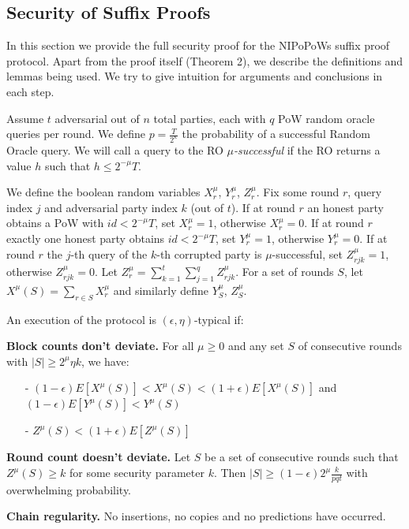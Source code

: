 \subsection{Security of Suffix Proofs} \label{proof_under_hard_fork}
In this section we provide the full security proof for the NIPoPoWs suffix proof
protocol\cite{nipopows}. Apart from the proof itself (Theorem 2), we describe the
definitions and lemmas being used. We try to give intuition for arguments and
conclusions in each step.

Assume $t$ adversarial out of $n$ total parties, each with $q$ PoW random oracle
queries per round. We define $p = \frac{T}{2^\kappa}$ the probability of a
successful Random Oracle query. We will call a query to the RO $\mu$\textit{-successful}
if the RO returns a value $h$ such that $h \leq 2^{-\mu}T$.

We define the boolean random variables $X_r^{\mu}$, $Y_r^{\mu}$, $Z_r^{\mu}$.
Fix some round $r$, query index $j$ and adversarial party index $k$ (out of $t$).
If at round $r$ an honest party obtains a PoW with $id < 2^{-\mu}T$, set $X_r^{\mu} = 1$,
otherwise $X_r^{\mu} = 0$. If at round $r$ exactly one honest party obtains
$id < 2^{-\mu}T$, set $Y_r^{\mu} = 1$, otherwise $Y_r^{\mu} = 0$. If at round $
r$ the $j$-th query of the $k$-th corrupted party is $\mu$-successful, set
$Z_{rjk}^{\mu} = 1$, otherwise $Z_{rjk}^{\mu} = 0$. Let $Z_r^{\mu} =
\sum_{k=1}^t\sum_{j=1}^qZ_{rjk}^{\mu}$. For a set of rounds $S$, let
$X^\mu(S) = \sum_{r \in S}X^{\mu}_r$ and similarly define $Y_S^{\mu}$, $Z_S^{\mu}$.\\

\begin{defn}
	An execution of the protocol is $(\epsilon, \eta)$-typical if:
	
	\textbf{Block counts don't deviate.} For all $\mu \geq 0$ and any set
	$S$ of consecutive rounds with $\vert S \vert \geq 2^\mu \eta k$, we have:
	\begin{itemize}
		\item[-] $(1-\epsilon)E[X^\mu(S)] < X^\mu(S) < (1+\epsilon)E[X^\mu(S)] $ and
			$(1-\epsilon)E[Y^\mu(S)] < Y^\mu(S)$
		\item[-] $Z^\mu(S) < (1+\epsilon)E[Z^\mu(S)]$
\end{itemize}

	\textbf{Round count doesn't deviate.} Let $S$ be a set of consecutive rounds
	such that $Z^\mu(S) \geq k$ for some security parameter $k$. Then $\vert S \vert
	\geq (1-\epsilon)2^\mu \frac{k}{pqt}$ with overwhelming probability.
	
	\textbf{Chain regularity.} No insertions, no copies and no predictions
	\cite{backbone} have occurred.
	\label{defn:typical_execution}
\end{defn}


